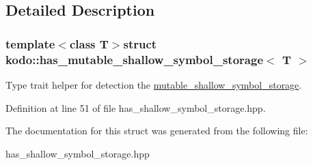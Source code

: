 \subsection{Detailed Description}
\subsubsection*{template$<$class T$>$struct kodo\-::has\-\_\-mutable\-\_\-shallow\-\_\-symbol\-\_\-storage$<$ T $>$}

Type trait helper for detection the \hyperlink{classkodo_1_1mutable__shallow__symbol__storage}{mutable\-\_\-shallow\-\_\-symbol\-\_\-storage}. 

Definition at line 51 of file has\-\_\-shallow\-\_\-symbol\-\_\-storage.\-hpp.



The documentation for this struct was generated from the following file\-:\begin{DoxyCompactItemize}
\item 
has\-\_\-shallow\-\_\-symbol\-\_\-storage.\-hpp\end{DoxyCompactItemize}
